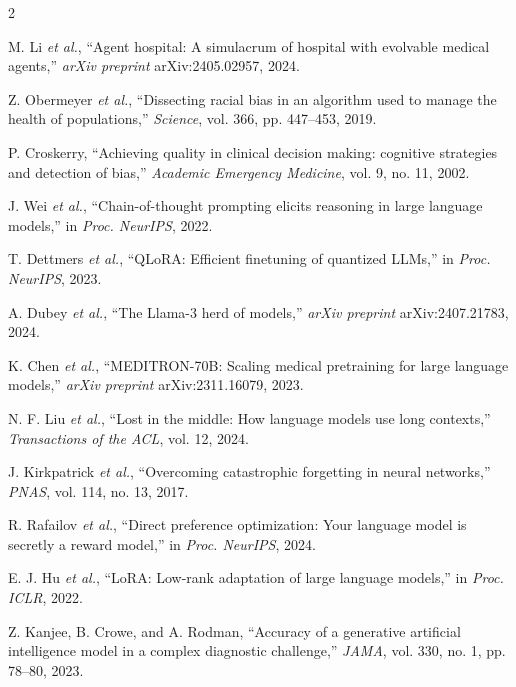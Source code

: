 \documentclass[10pt, a4paper]{article}
\begin{document}
\begin{multicols}{2}
\begin{footnotesize}
\begin{enumerate}[label={[\arabic*]}, leftmargin=*, itemsep=2pt]
\item\label{ref:li} M. Li \textit{et al.}, ``Agent hospital: A simulacrum of hospital with evolvable medical agents,'' \textit{arXiv preprint} arXiv:2405.02957, 2024.

\item\label{ref:obermeyer} Z. Obermeyer \textit{et al.}, ``Dissecting racial bias in an algorithm used to manage the health of populations,'' \textit{Science}, vol. 366, pp. 447–453, 2019.

\item\label{ref:croskerry} P. Croskerry, ``Achieving quality in clinical decision making: cognitive strategies and detection of bias,'' \textit{Academic Emergency Medicine}, vol. 9, no. 11, 2002.

\item\label{ref:wei} J. Wei \textit{et al.}, ``Chain-of-thought prompting elicits reasoning in large language models,'' in \textit{Proc. NeurIPS}, 2022.

\item\label{ref:dettmers} T. Dettmers \textit{et al.}, ``QLoRA: Efficient finetuning of quantized LLMs,'' in \textit{Proc. NeurIPS}, 2023.

\item\label{ref:dubey} A. Dubey \textit{et al.}, ``The Llama-3 herd of models,'' \textit{arXiv preprint} arXiv:2407.21783, 2024.

\item\label{ref:chen} K. Chen \textit{et al.}, ``MEDITRON-70B: Scaling medical pretraining for large language models,'' \textit{arXiv preprint} arXiv:2311.16079, 2023.

\item\label{ref:liu} N. F. Liu \textit{et al.}, ``Lost in the middle: How language models use long contexts,'' \textit{Transactions of the ACL}, vol. 12, 2024.

\item\label{ref:kirkpatrick} J. Kirkpatrick \textit{et al.}, ``Overcoming catastrophic forgetting in neural networks,'' \textit{PNAS}, vol. 114, no. 13, 2017.

\item\label{ref:rafailov} R. Rafailov \textit{et al.}, ``Direct preference optimization: Your language model is secretly a reward model,'' in \textit{Proc. NeurIPS}, 2024.

\item\label{ref:hu} E. J. Hu \textit{et al.}, ``LoRA: Low-rank adaptation of large language models,'' in \textit{Proc. ICLR}, 2022.

\item\label{ref:kanjee} Z. Kanjee, B. Crowe, and A. Rodman, ``Accuracy of a generative artificial intelligence model in a complex diagnostic challenge,'' \textit{JAMA}, vol. 330, no. 1, pp. 78–80, 2023.

\end{enumerate}
\end{footnotesize}

\end{multicols}
\end{document}
